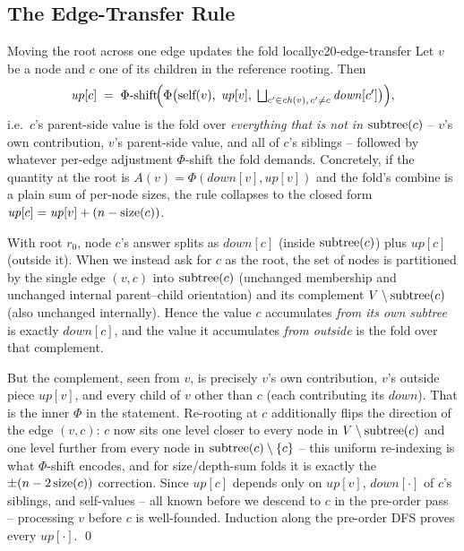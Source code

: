 \subsection{The Edge-Transfer Rule}

\begin{theorem}{Moving the root across one edge updates the fold locally}{c20-edge-transfer}
Let $v$ be a node and $c$ one of its children in the reference rooting. Then
\[
  \mathit{up}[c] \;=\; \Phi\text{-}\!\operatorname{shift}\!\Bigl(
     \Phi\bigl(\text{self}(v),\; \mathit{up}[v],\;
     \textstyle\bigsqcup_{c' \in \mathit{ch}(v),\, c' \ne c} \mathit{down}[c']\bigr)
  \Bigr),
\]
i.e.\ $c$'s parent-side value is the fold over \emph{everything that is not in
$\operatorname{subtree}(c)$} -- $v$'s own contribution, $v$'s parent-side value, and all of
$c$'s siblings -- followed by whatever per-edge adjustment $\Phi$-shift the fold
demands. Concretely, if the quantity at the root is $A(v)=\Phi(\mathit{down}[v],
\mathit{up}[v])$ and the fold's combine is a plain sum of per-node sizes, the
rule collapses to the closed form $\mathit{up}[c]=\mathit{up}[v]+(n-\operatorname{size}(c))$.
\end{theorem}

\begin{proofbox}
With root $r_0$, node $c$'s answer splits as $\mathit{down}[c]$ (inside
$\operatorname{subtree}(c)$) plus $\mathit{up}[c]$ (outside it). When we instead ask for
$c$ as the root, the set of nodes is partitioned by the single edge $(v,c)$ into
$\operatorname{subtree}(c)$ (unchanged membership and unchanged internal parent--child
orientation) and its complement $V\setminus\operatorname{subtree}(c)$ (also unchanged
internally). Hence the value $c$ accumulates \emph{from its own subtree} is
exactly $\mathit{down}[c]$, and the value it accumulates \emph{from outside}
is the fold over that complement.

But the complement, seen from $v$, is precisely $v$'s own contribution,
$v$'s outside piece $\mathit{up}[v]$, and every child of $v$ other than $c$
(each contributing its $\mathit{down}$). That is the inner $\Phi$ in the
statement. Re-rooting at $c$ additionally flips the direction of the edge
$(v,c)$: $c$ now sits one level closer to every node in $V\setminus\operatorname{subtree}(c)$
and one level further from every node in $\operatorname{subtree}(c)\setminus\{c\}$ -- this
uniform re-indexing is what $\Phi$-shift encodes, and for size/depth-sum folds
it is exactly the $\pm(n-2\operatorname{size}(c))$ correction. Since $\mathit{up}[c]$ depends
only on $\mathit{up}[v]$, $\mathit{down}[\cdot]$ of $c$'s siblings, and
self-values -- all known before we descend to $c$ in the pre-order pass --
processing $v$ before $c$ is well-founded. Induction along the pre-order DFS
proves every $\mathit{up}[\cdot]$. \qed
\end{proofbox}

